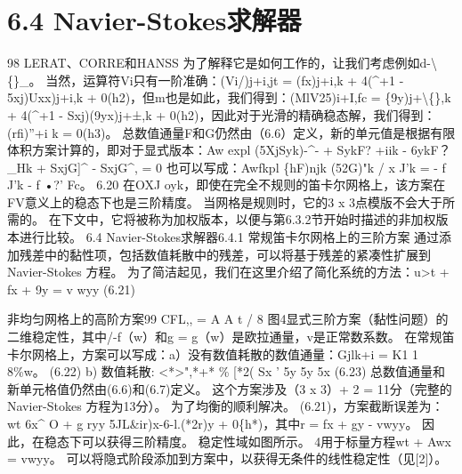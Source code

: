 \documentclass[UTF8,11pt,a4paper,openany,fontset=fandol]{ctexbook}
\begin{document}
\section{6.4 Navier-Stokes求解器}
98 LERAT、CORRE和HANSS 为了解释它是如何工作的，让我们考虑例如d-\textbackslash\{\}\_。 当然，运算符Vi只有一阶准确：(Vi/)j+i,jt = (fx)j+i,k + 4(\textasciicircum{}+1 - 5xj)Uxx)j+i,k + 0(h2)，但m也是如此，我们得到：(MlV25)i+I,fc = \{9y)j+\textbackslash\{\},k + 4(\textasciicircum{}+1 - Sxj)(9yx)j+±,k + 0(h2)，因此对于光滑的精确稳态解，我们得到：(rfi)”+i k = 0(h3)。 总数值通量F和G仍然由（6.6）定义，新的单元值是根据有限体积方案计算的，即对于显式版本：Aw expl (5XjSyk)-\textasciicircum{}- + SykF? +iik - 6ykF？ \_Hk + SxjG]\textasciicircum{} - SxjG\textasciicircum{}, = 0 也可以写成：Awfkpl \{hF)njk (52G)"k / x J'k = - f J'k - f •?' Fc。 6.20 在OXJ oyk，即使在完全不规则的笛卡尔网格上，该方案在FV意义上的稳态下也是三阶精度。 当网格是规则时，它的3 x 3点模版不会大于所需的。 在下文中，它将被称为加权版本，以便与第6.3.2节开始时描述的非加权版本进行比较。 6.4 Navier-Stokes求解器6.4.1 常规笛卡尔网格上的三阶方案 通过添加残差中的黏性项，包括数值耗散中的残差，可以将基于残差的紧凑性扩展到Navier-Stokes 方程。 为了简洁起见，我们在这里介绍了简化系统的方法：u>t + fx + 9y = v wyy (6.21)

非均匀网格上的高阶方案99 CFL,, = A A t / 8 图4显式三阶方案（黏性问题）的二维稳定性，其中/-f（w）和g = g（w）是欧拉通量，v是正常数系数。 在常规笛卡尔网格上，方案可以写成：a）没有数值耗散的数值通量：Gjlk+i = K1 1 8\%w。 (6.22) b) 数值耗散: <*>",*+* \% [*2( Sx ' 5y 5y 5x (6.23) 总数值通量和新单元格值仍然由(6.6)和(6.7)定义。 这个方案涉及（3 x 3）+ 2 = 11分（完整的Navier-Stokes 方程为13分）。 为了均衡的顺利解决。 (6.21)，方案截断误差为：wt 6x\textasciicircum{} O + g ryy 5JL\&ir)x-6-l.(*2r)y + 0\{h*)，其中r = fx + gy - vwyy。 因此，在稳态下可以获得三阶精度。 稳定性域如图所示。 4用于标量方程wt + Awx = vwyy。 可以将隐式阶段添加到方案中，以获得无条件的线性稳定性（见[2]）。
\end{document}

